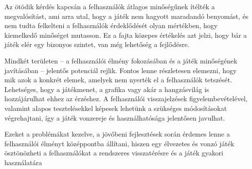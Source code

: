 Az ötödik kérdés kapcsán a felhasználók átlagos minőségűnek ítélték a megvalósítást, ami arra utal, hogy a játék nem hagyott maradandó benyomást, és nem tudta felkelteni a felhasználók érdeklődését olyan mértékben, hogy kiemelkedő minőséget mutasson. Ez a fajta közepes értékelés azt jelzi, hogy bár a játék elér egy bizonyos szintet, van még lehetőség a fejlődésre.

Mindkét területen – a felhasználói élmény fokozásában és a játék minőségének javításában – jelentős potenciál rejlik. Fontos lenne részletesen elemezni, hogy mik azok a konkrét elemek, amelyek nem nyerték el a felhasználók tetszését. Lehetséges, hogy a játékmenet, a grafika vagy akár a hangzásvilág is hozzájárulhat ehhez az érzéshez. A felhasználói visszajelzések figyelembevételével, valamint alapos tesztelésekkel képesek lehetünk a szükséges módosításokat végrehajtani, így a játék vonzereje és használhatósága jelentősen javulhat.

Ezeket a problémákat kezelve, a jövőbeni fejlesztések során érdemes lenne a felhasználói élményt középpontba állítani, hiszen egy élvezetes és vonzó játék ösztönözheti a felhasználókat a rendszeres visszatérésre és a játék gyakori használatára
